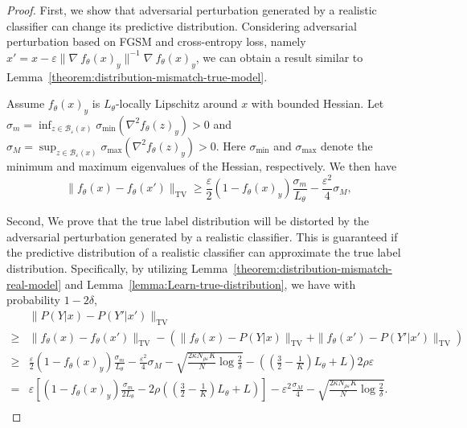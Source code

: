 \begin{proof}
    First, we show that adversarial perturbation generated by a realistic classifier can change its predictive distribution. Considering adversarial perturbation based on FGSM and cross-entropy loss, namely $x' = x -\varepsilon \|\nabla~f_\theta(x)_y\|^{-1} \nabla~f_\theta(x)_y$, we can obtain a result similar to Lemma~\ref{theorem:distribution-mismatch-true-model}.
    \begin{lemma}
    \label{theorem:distribution-mismatch-real-model}
    Assume $f_\theta(x)_y$ is $L_\theta$-locally Lipschitz around $x$ with bounded Hessian. Let $\sigma_m = \inf_{z \in \mathcal{B}_\varepsilon(x)} \sigma_{\min} (\nabla^2 f_\theta(z)_y) > 0$ and $\sigma_M = \sup_{z \in \mathcal{B}_\varepsilon(x)} \sigma_{\max} (\nabla^2 f_\theta(z)_y) > 0$.
    Here $\sigma_{\min}$ and $\sigma_{\max}$ denote the minimum and maximum eigenvalues of the Hessian, respectively.
    We then have
    \begin{equation}
        \| f_\theta(x) -  f_\theta(x')\|_{\text{TV}} \ge
        \frac{\varepsilon}{2} (1 - f_\theta(x)_y) \frac{\sigma_m}{L_\theta}  - \frac{\varepsilon^2}{4} \sigma_M,
    \end{equation}
    \end{lemma}


Second, We prove that the true label distribution will be distorted by the adversarial perturbation generated by a realistic classifier. This is guaranteed if the predictive distribution of a realistic classifier can approximate the true label distribution. Specifically, by utilizing Lemma~\ref{theorem:distribution-mismatch-real-model} and Lemma~\ref{lemma:Learn-true-distribution}, we have with probability $1 - 2\delta$,
\begin{equation}
\begin{aligned}
& \|P(Y|x)  - P(Y'|x') \|_{\text{TV}} \\ 
\ge & \|f_\theta(x)  - f_\theta(x')\|_{\text{TV}} - (\|f_\theta(x) - P(Y|x)\|_{\text{TV}} + \|f_\theta(x') - P(Y'|x')\|_{\text{TV}})\\
\ge & \frac{\varepsilon}{2} (1 - f_\theta(x)_y) \frac{\sigma_m}{L_\theta}  - \frac{\varepsilon^2}{4} \sigma_M - \sqrt{\frac{2\kappa N_{\rho\varepsilon} K}{N}\log\frac{2}{\delta}}  - \left(\left(\frac{3}{2} - \frac{1}{K}\right) L_\theta + L\right)2\rho\varepsilon \\
= & \varepsilon \left[(1 - f_\theta(x)_y) \frac{\sigma_m}{2L_\theta} - 2\rho\left(\left(\frac{3}{2} - \frac{1}{K}\right) L_\theta + L\right)\right] - \varepsilon^2\frac{\sigma_M}{4}  - \sqrt{\frac{2\kappa N_{\rho\varepsilon} K}{N}\log\frac{2}{\delta}}. \\
\end{aligned}    
\end{equation}


\end{proof}
